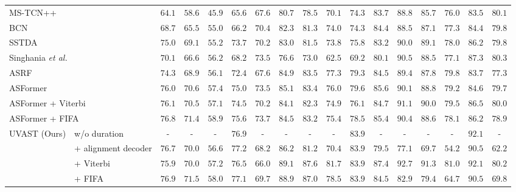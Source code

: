 \begin{table}[t]
{\begin{tabular}{ll|ccc|c|c||ccc|c|c||ccc|c|c}
\multicolumn{2}{l|}{MS-TCN++ \cite{li2020ms}} & $64.1$ & $58.6$ & $45.9$ & $65.6$ & $67.6$ & $80.7$ & $78.5$ & $70.1$ & $74.3$ & $83.7$ & $88.8$ & $85.7$ & $76.0$ & $83.5$ & $80.1$\\
\multicolumn{2}{l|}{BCN \cite{wang2020boundary}} & $68.7$ & $65.5$ & $55.0$ & $66.2$ & $70.4$ & $82.3$ & $81.3$ & $74.0$ & $74.3$ & $84.4$ & $88.5$ & $87.1$ & $77.3$ & $84.4$ & $79.8$\\
\multicolumn{2}{l|}{SSTDA \cite{chen2020action}} & $75.0$ & $69.1$ & $55.2$ & $73.7$ & $70.2$ & $83.0$ & $81.5$ & $73.8$ & $75.8$ & $83.2$ & $90.0$ & $89.1$ & $78.0$ & $86.2$ & $79.8$\\
\multicolumn{2}{l|}{Singhania \textit{et al.} \cite{singhania2021coarse}} & $70.1$ & $66.6$ & $56.2$ & $68.2$ & \uline{$73.5$} & $76.6$ & $73.0$ & $62.5$ & $69.2$ & $80.1$ & $90.5$ & $88.5$ & $77.1$ & $87.3$ & $\mathbf{80.3}$\\
\multicolumn{2}{l|}{ASRF \cite{asrf}} & $74.3$ & $68.9$ & $56.1$ & $72.4$ & $67.6$ & $84.9$ & $83.5$ & $77.3$ & $79.3$ & $84.5$ & $89.4$ & $87.8$ & \uline{$79.8$} & $83.7$ & $77.3$\\
\multicolumn{2}{l|}{ASFormer \cite{asformer}} & $76.0$ & $70.6$ & $57.4$ & $75.0$ & \uline{$73.5$} & $85.1$ & $83.4$ & $76.0$ & \uline{$79.6$} & \uline{$85.6$} & $90.1$ &  $88.8$  & $79.2$ & $84.6$ & $79.7$\\
\multicolumn{2}{l|}{ASFormer \cite{asformer} + Viterbi} & $76.1$ & $70.5$ & $57.1$ & $74.5$ & $70.2$ & $84.1$ & $82.3$ & $74.9$ & $76.1$ & $84.7$ & \underline{$91.1$} & \underline{$90.0$} & $79.5$ & $86.5$ & $80.0$ \\
\multicolumn{2}{l|}{ASFormer \cite{asformer} + FIFA} & \underline{$76.8$} & \underline{$71.4$} & $\mathbf{58.9}$ & $75.6$ & $\mathbf{73.7}$ & $84.5$ & $83.2$ & $75.4$ & $78.5$ & $85.4$ & $90.4$ & $88.6$ & $78.1$ & $86.2$ & $78.9$ \\ 
\hline 
\multirow{4}{*}{UVAST (Ours)} & w/o duration & - & - & - & $76.9$ & - & - & - & - & $\mathbf{83.9}$ & - & - & - & - & $\mathbf{92.1}$ & - \\
  & + alignment decoder & $76.7$ & $70.0$ & $56.6$ & $\mathbf{77.2}$ & $68.2$ & $86.2$ & $81.2$ & $70.4$ & $\mathbf{83.9}$ & $79.5$ & $77.1$ & $69.7$ & $54.2$ & \uline{$90.5$} & $62.2$ \\
  & + Viterbi & $75.9$ & $70.0$ & $57.2$ & $76.5$ & $66.0$ & $\mathbf{89.1}$ & $\mathbf{87.6}$ & $\mathbf{81.7}$ & $\mathbf{83.9}$ & $\mathbf{87.4}$ & $\mathbf{92.7}$ & $\mathbf{91.3}$ & $\mathbf{81.0}$ & $\mathbf{92.1}$ & \uline{$80.2$} \\
  & + FIFA & $\mathbf{76.9}$ & $\mathbf{71.5}$ & \underline{$58.0$} & \uline{$77.1$} & $69.7$ & \uline{$88.9$} & \uline{$87.0$} & \uline{$78.5$} & $\mathbf{83.9}$ & $84.5$ & $82.9$ & $79.4$ & $64.7$ & \uline{$90.5$} & $69.8$ \\
\hline 
\hline
\end{tabular}
}
\label{tab:fully_supervised}
\end{table}
